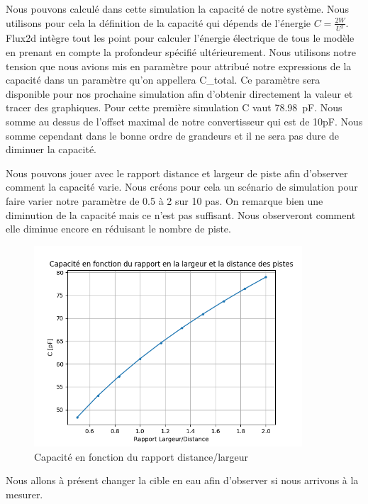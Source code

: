 Nous pouvons calculé dans cette simulation la capacité de notre système. Nous utilisons pour cela la définition de la capacité qui dépends de l'énergie $C = \frac{2W}{U^2}$. Flux2d intègre tout les point pour calculer l'énergie électrique de tous le modèle en prenant en compte la profondeur spécifié ultérieurement. Nous utilisons notre tension que nous avions mis en paramètre pour attribué notre expressions de la capacité dans un paramètre qu'on appellera C\_total. Ce paramètre sera disponible pour nos prochaine simulation afin d'obtenir directement la valeur et tracer des graphiques. Pour cette première simulation C vaut \SI{78.98}{\pico\farad}. Nous somme au dessus de l'offset maximal de notre convertisseur qui est de 10pF. Nous somme cependant dans le bonne ordre de grandeurs et il ne sera pas dure de diminuer la capacité. 

Nous pouvons jouer avec le rapport distance et largeur de piste afin d'observer comment la capacité varie. Nous créons pour cela un scénario de simulation pour faire varier notre paramètre de 0.5 à 2 sur 10 pas. On remarque bien une diminution de la capacité mais ce n'est pas suffisant. Nous observeront comment elle diminue encore en réduisant le nombre de piste.

\newpage

\begin{figure}[!ht]
 \centering
 \includegraphics[width=10cm]{C20airGraph.png}
 \caption{Capacité en fonction du rapport distance/largeur}
\end{figure}

Nous allons à présent changer la cible en eau afin d'observer si nous arrivons à la mesurer.



